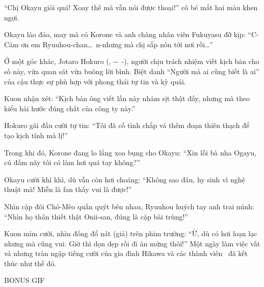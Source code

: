 \documentclass[../main.tex]{subfiles}
\begin{document}
``Chị Okayu giỏi quá! Xoay thế mà vẫn nói được thoại!'' cô bé mắt hai màu khen ngợi.

Okayu lảo đảo, may mà có Korone và anh chàng nhân viên Fukuyasu đỡ kịp: ``C-Cảm ơn em Ryuuhou-chan\dots\ n-nhưng mà chị sắp nôn tới nơi rồi\dots''

Ở một góc khác, Jotaro Hokuro (, --\ -), người chịu trách nhiệm viết kịch bản cho số này, vừa quan sát vừa buông lời bình. Biệt danh ``Người mà ai cũng biết là ai'' của cậu thực sự phù hợp với phong thái tự tin và kỳ quái.

Kuon nhận xét: ``Kịch bản ông viết lần này nhảm sịt thật đấy, nhưng mà theo kiểu hài hước đúng chất của công ty này.''

Hokuro gãi đầu cười tự tin: ``Tôi đã cố tình chắp vá thêm đoạn thiên thạch để tạo kịch tính mà lị!''

Trong khi đó, Korone đang lo lắng xoa bụng cho Okayu: ``Xin lỗi bà nha Ogayu, cú đấm nãy tôi có làm hơi quá tay không?''

Okayu cười khì khì, dù vẫn còn hơi choáng: ``Không sao đâu, hy sinh vì nghệ thuật mà! Miễn là fan thấy vui là được!''

Nhìn cặp đôi Chó-Mèo quấn quýt bên nhau, Ryuuhou huých tay anh trai mình: ``Nhìn họ thân thiết thật Onii-san, đúng là cặp bài trùng!''

Kuon mỉm cười, nhìn đống đổ nát (giả) trên phim trường: ``Ừ, dù có hơi loạn lạc nhưng mà cũng vui. Giờ thì dọn dẹp rồi đi ăn mừng thôi!''
Một ngày làm việc vất vả nhưng tràn ngập tiếng cười của gia đình Hikawa và các thành viên \hll\ đã kết thúc như thế đó.

\begin{center}
  {\ab BONUS GIF}
\end{center}
\end{document}
